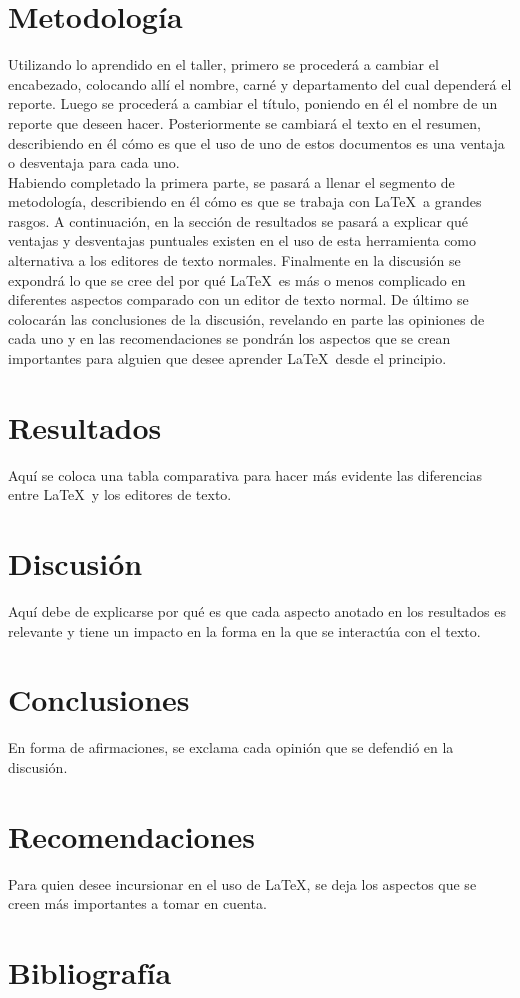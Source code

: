 \documentclass[10pt,letterpaper]{article}
\begin{document}
\begin{multicols}{2}
\section*{Metodolog\'ia}
Utilizando lo aprendido en el taller, primero se proceder\'a a cambiar el encabezado, colocando all\'i el nombre, carn\'e y departamento del cual depender\'a el reporte. Luego se proceder\'a a cambiar el t\'itulo, poniendo en \'el el nombre de un reporte que deseen hacer. Posteriormente se cambiar\'a el texto en el resumen, describiendo en \'el c\'omo es que el uso de uno de estos documentos es una ventaja o desventaja para cada uno.\\

Habiendo completado la primera parte, se pasar\'a a llenar el segmento de metodolog\'ia, describiendo en \'el c\'omo es que se trabaja con \LaTeX\ a grandes rasgos. A continuaci\'on, en la secci\'on de resultados se pasar\'a a explicar qu\'e ventajas y desventajas puntuales existen en el uso de esta herramienta como alternativa a los editores de texto normales. Finalmente en la discusi\'on se expondr\'a lo que se cree del por qu\'e \LaTeX\ es m\'as o menos complicado en diferentes aspectos comparado con un editor de texto normal. De \'ultimo se colocar\'an las conclusiones de la discusi\'on, revelando en parte las opiniones de cada uno y en las recomendaciones se pondr\'an los aspectos que se crean importantes para alguien que desee aprender \LaTeX\ desde el principio.


\section*{Resultados}
Aqu\'i se coloca una tabla comparativa para hacer m\'as evidente las diferencias entre \LaTeX\ y los editores de texto.

\section*{Discusi\'on}
Aqu\'i debe de explicarse por qu\'e es que cada aspecto anotado en los resultados es relevante y tiene un impacto en la forma en la que se interact\'ua con el texto.

\section*{Conclusiones}
En forma de afirmaciones, se exclama cada opini\'on que se defendi\'o en la discusi\'on.

\section*{Recomendaciones}
Para quien desee incursionar en el uso de \LaTeX , se deja los aspectos que se creen m\'as importantes a tomar en cuenta.


\section*{Bibliograf\'ia}


\end{multicols}
\end{document}
